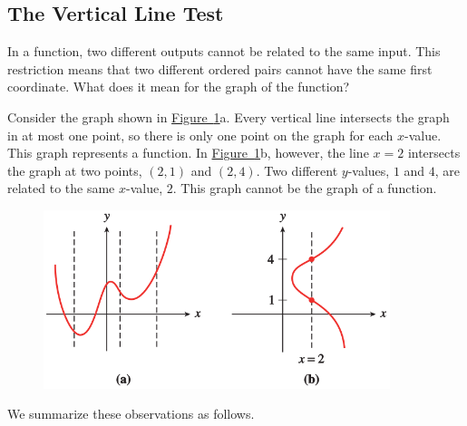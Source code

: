 \documentclass[10pt,]{book}
\theoremstyle{plain}
\theoremstyle{definition}
\theoremstyle{definition}
\numberwithin{equation}{section}
\begin{document}
\subsection[The Vertical Line Test]{The Vertical Line Test}\label{subsection-15}
In a function, two different outputs cannot be related to the same input. This restriction means that two different ordered pairs cannot have the same first coordinate. What does it mean for the graph of the function?%
\par
Consider the graph shown in \hyperref[fig-vertical-line-test]{Figure~\ref{fig-vertical-line-test}}a. Every vertical line intersects the graph in at most one point, so there is only one point on the graph for each \(x\)-value. This graph represents a function. In \hyperref[fig-vertical-line-test]{Figure~\ref{fig-vertical-line-test}}b, however, the line \(x = 2\) intersects the graph at two points, \((2, 1)\) and \((2, 4)\). Two different \(y\)-values, \(1\) and \(4\), are related to the same \(x\)-value, \(2\). This graph cannot be the graph of a function.%
\leavevmode%
\begin{figure}
\centering
\includegraphics[width=0.90\textwidth,]{images/fig-vertical-line-test.svg}\caption{\label{fig-vertical-line-test}}
\end{figure}
\par
We summarize these observations as follows.%
\typeout{************************************************}
\typeout{************************************************}
\end{document}
